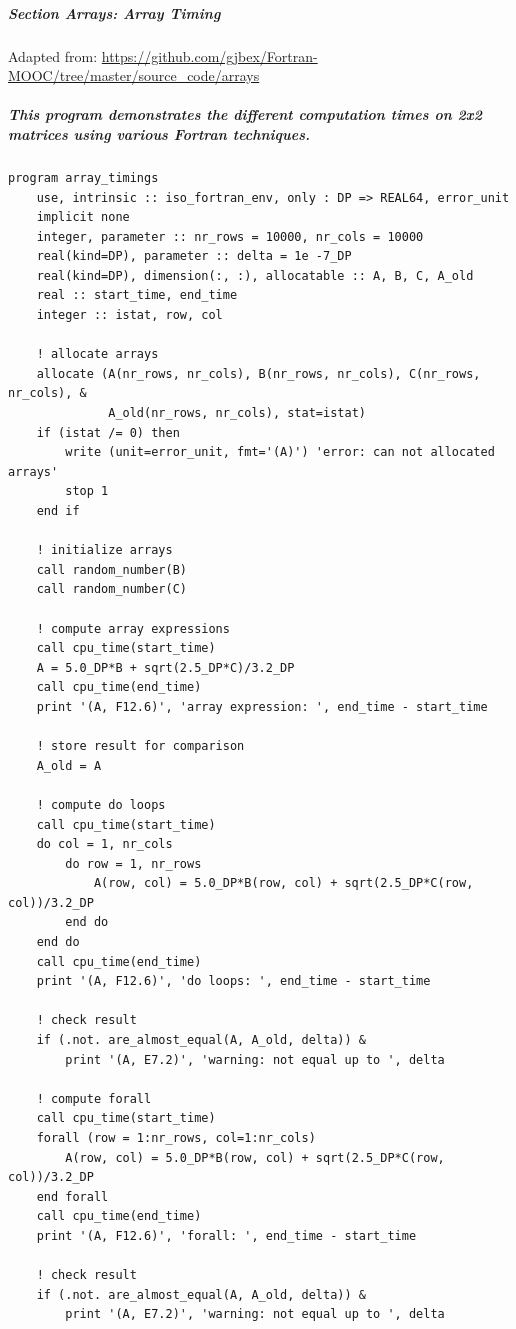 \subparagraph{Section Arrays: Array Timing}

Adapted from: \href{https://github.com/gjbex/Fortran-MOOC/tree/master/source\_code/arrays}{https://github.com/gjbex/Fortran-MOOC/tree/master/source\_code/arrays}

\subparagraph{This program demonstrates the different computation times on 2x2 matrices using various Fortran techniques.}

\begin{verbatim}
program array_timings
    use, intrinsic :: iso_fortran_env, only : DP => REAL64, error_unit
    implicit none
    integer, parameter :: nr_rows = 10000, nr_cols = 10000
    real(kind=DP), parameter :: delta = 1e -7_DP
    real(kind=DP), dimension(:, :), allocatable :: A, B, C, A_old
    real :: start_time, end_time
    integer :: istat, row, col

    ! allocate arrays
    allocate (A(nr_rows, nr_cols), B(nr_rows, nr_cols), C(nr_rows, nr_cols), &
              A_old(nr_rows, nr_cols), stat=istat)
    if (istat /= 0) then
        write (unit=error_unit, fmt='(A)') 'error: can not allocated arrays'
        stop 1
    end if

    ! initialize arrays
    call random_number(B)
    call random_number(C)

    ! compute array expressions
    call cpu_time(start_time)
    A = 5.0_DP*B + sqrt(2.5_DP*C)/3.2_DP
    call cpu_time(end_time)
    print '(A, F12.6)', 'array expression: ', end_time - start_time

    ! store result for comparison
    A_old = A

    ! compute do loops
    call cpu_time(start_time)
    do col = 1, nr_cols
        do row = 1, nr_rows
            A(row, col) = 5.0_DP*B(row, col) + sqrt(2.5_DP*C(row, col))/3.2_DP
        end do
    end do
    call cpu_time(end_time)
    print '(A, F12.6)', 'do loops: ', end_time - start_time

    ! check result
    if (.not. are_almost_equal(A, A_old, delta)) &
        print '(A, E7.2)', 'warning: not equal up to ', delta

    ! compute forall
    call cpu_time(start_time)
    forall (row = 1:nr_rows, col=1:nr_cols)
        A(row, col) = 5.0_DP*B(row, col) + sqrt(2.5_DP*C(row, col))/3.2_DP
    end forall
    call cpu_time(end_time)
    print '(A, F12.6)', 'forall: ', end_time - start_time

    ! check result
    if (.not. are_almost_equal(A, A_old, delta)) &
        print '(A, E7.2)', 'warning: not equal up to ', delta


\end{verbatim}
